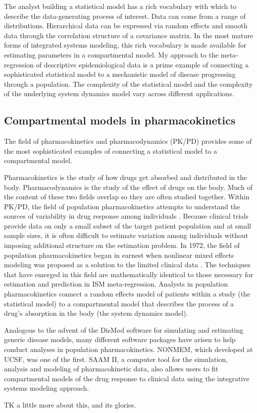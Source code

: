 The analyst building a statistical model has a rich vocabulary with
which to describe the data-generating process of interest. Data can
come from a range of distributions. Hierarchical data can be expressed
via random effects and smooth data through the correlation structure
of a covariance matrix. In the most mature forms of integrated systems
modeling, this rich vocabulary is made available for estimating
parameters in a compartmental model. My approach to the meta-regression of descriptive epidemiological data is a prime example of
connecting a sophisticated statistical model to a mechanistic model of disease progressing
through a population. The complexity of the statistical model and the
complexity of the underlying system dynamics model vary across
different applications.

\subsection{Compartmental models in pharmacokinetics}
The field of pharmacokinetics and pharmacodynamics (PK/PD) provides
some of the most sophisticated examples of connecting a statistical
model to a compartmental model.

Pharmacokinetics is the study of how drugs get absorbed and
distributed in the body. Pharmacodynamics is the study of the effect
of drugs on the body. Much of the content of these two fields overlap
so they are often studied together. Within PK/PD, the field of
population pharmacokinetics attempts to understand the sources of
variability in drug response among individuals
\cite{Yuh_Population_1994}. Because clinical trials provide data on
only a small subset of the target patient population and at small
sample sizes, it is often difficult to estimate variation among
individuals without imposing additional structure on the estimation
problem. In 1972, the field of population pharmacokinetics began in
earnest when nonlinear mixed effects modeling was proposed as a
solution to the limited clinical data
\cite{Sheiner_Modelling_1972}. The techniques that have emerged in
this field are mathematically identical to those necessary for estimation and prediction
in ISM meta-regression. Analysts in
population pharmacokinetics connect a random effects model of patients
within a study (the statistical model) to a compartmental model that
describes the process of a drug's absorption in the body (the system dynamics model).

Analogous to the advent of the DisMod software for simulating and
estimating generic disease models, many different software packages
have arisen to help conduct analyses in population
pharmacokinetics. NONMEM, which developed at UCSF, was one of the
first.\cite{Beal_NONMEM_2009} SAAM II, a computer tool for the
simulation, analysis and modeling of pharmacokinetic data, also allows
users to fit compartmental models of the drug response to clinical
data using the integrative systems modeling
approach.\cite{Barrett_SAAM_1998}

TK a little more about this, and its glories.




